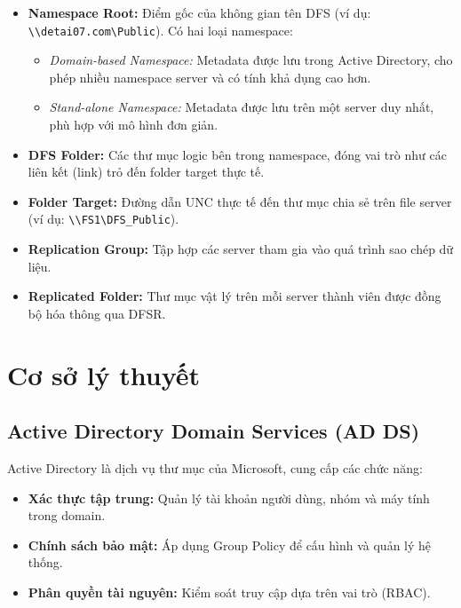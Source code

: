 \begin{itemize}
    \item \textbf{Namespace Root:} Điểm gốc của không gian tên DFS (ví dụ: \texttt{\textbackslash\textbackslash detai07.com\textbackslash Public}). Có hai loại namespace:
    \begin{itemize}
        \item \textit{Domain-based Namespace:} Metadata được lưu trong Active Directory, cho phép nhiều namespace server và có tính khả dụng cao hơn.
        \item \textit{Stand-alone Namespace:} Metadata được lưu trên một server duy nhất, phù hợp với mô hình đơn giản.
    \end{itemize}
    
    \item \textbf{DFS Folder:} Các thư mục logic bên trong namespace, đóng vai trò như các liên kết (link) trỏ đến folder target thực tế.
    
    \item \textbf{Folder Target:} Đường dẫn UNC thực tế đến thư mục chia sẻ trên file server (ví dụ: \texttt{\textbackslash\textbackslash FS1\textbackslash DFS\_Public}).
    
    \item \textbf{Replication Group:} Tập hợp các server tham gia vào quá trình sao chép dữ liệu.
    
    \item \textbf{Replicated Folder:} Thư mục vật lý trên mỗi server thành viên được đồng bộ hóa thông qua DFSR.
\end{itemize}

\section{Cơ sở lý thuyết}

\subsection{Active Directory Domain Services (AD DS)}

Active Directory là dịch vụ thư mục của Microsoft, cung cấp các chức năng:

\begin{itemize}
    \item \textbf{Xác thực tập trung:} Quản lý tài khoản người dùng, nhóm và máy tính trong domain.
    \item \textbf{Chính sách bảo mật:} Áp dụng Group Policy để cấu hình và quản lý hệ thống.
    \item \textbf{Phân quyền tài nguyên:} Kiểm soát truy cập dựa trên vai trò (RBAC).
\end{itemize}

